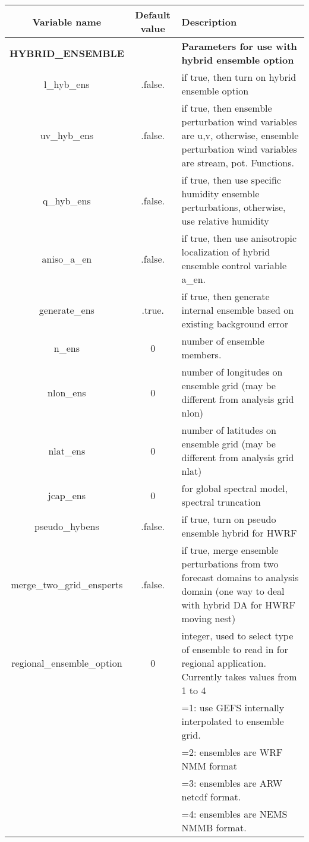 \begin{table}[h]
 \footnotesize
 \center
 \begin{tabular}{| c | c | p{9cm} |}
 \hline
 Variable name & Default value & Description \\
 \hline
\textbf{HYBRID\_ENSEMBLE} & &  \textbf{Parameters for use with hybrid ensemble option} \\
 \hline
 l\_hyb\_ens & .false. & if true, then turn on hybrid ensemble option \\
 \hline
 uv\_hyb\_ens & .false. & if true, then ensemble perturbation wind variables are u,v, otherwise, ensemble perturbation wind variables are stream, pot. Functions.\\
 \hline
 q\_hyb\_ens & .false. & if true, then use specific humidity ensemble perturbations, otherwise, use relative humidity\\
 \hline
 aniso\_a\_en & .false. & if true, then use anisotropic localization of hybrid ensemble control variable a\_en.\\
 \hline
 generate\_ens & .true. & if true, then generate internal ensemble based on existing background error \\
 \hline
 n\_ens & 0 & number of ensemble members. \\
 \hline
 nlon\_ens & 0 & number of longitudes on ensemble grid (may be different from analysis grid nlon) \\
 \hline
 nlat\_ens & 0 & number of latitudes on ensemble grid (may be different from analysis grid nlat) \\
 \hline
 jcap\_ens & 0 & for global spectral model, spectral truncation \\
 \hline
 pseudo\_hybens & .false. & if true, turn on pseudo ensemble hybrid for HWRF \\
 \hline
 merge\_two\_grid\_ensperts & .false. & if true, merge ensemble perturbations from two forecast domains to analysis domain (one way to deal with hybrid DA for HWRF moving nest) \\
 \hline
 regional\_ensemble\_option & 0 & integer, used to select type of ensemble to read in for regional application.  Currently takes values from 1 to 4 \\
        &&=1: use GEFS internally interpolated to ensemble grid. \\
        &&=2: ensembles are WRF NMM format \\
        &&=3: ensembles are ARW netcdf format. \\
        &&=4: ensembles are NEMS NMMB format. \\

\end{tabular}
\end{table}
